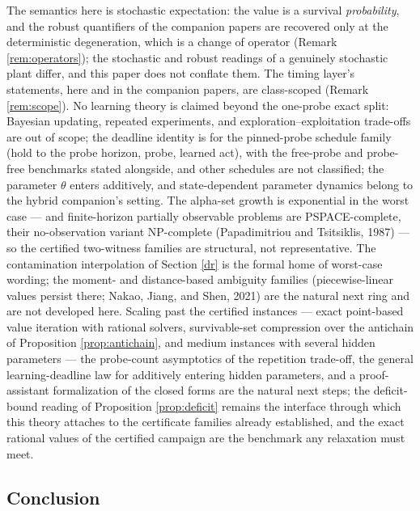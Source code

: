 \documentclass[10pt,twocolumn]{article}
\theoremstyle{plain}
\theoremstyle{definition}
\theoremstyle{remark}
\begin{document}
The semantics here is stochastic expectation: the value is a survival
\emph{probability}, and the robust quantifiers of the companion papers
are recovered only at the deterministic degeneration, which is a change
of operator (Remark \ref{rem:operators}); the stochastic and robust
readings of a genuinely stochastic plant differ, and this paper does not
conflate them. The timing layer's statements, here and in the companion
papers, are class-scoped (Remark \ref{rem:scope}). No learning theory is
claimed beyond the one-probe exact split: Bayesian updating, repeated
experiments, and exploration--exploitation trade-offs are out of scope;
the deadline identity is for the pinned-probe schedule family (hold to
the probe horizon, probe, learned act), with the free-probe and
probe-free benchmarks stated alongside, and other schedules are not
classified; the parameter
\(\theta\) enters additively, and state-dependent parameter dynamics
belong to the hybrid companion's setting. The alpha-set growth is
exponential in the worst case --- and finite-horizon partially
observable problems are PSPACE-complete, their no-observation variant
NP-complete (Papadimitriou and Tsitsiklis, 1987) --- so the certified
two-witness families are structural, not representative. The contamination interpolation of Section \ref{dr} is the formal home
of worst-case wording; the moment- and distance-based ambiguity families
(piecewise-linear values persist there; Nakao, Jiang, and Shen, 2021)
are the natural next ring and are not developed here.
Scaling past the certified instances --- exact point-based value iteration
with rational solvers, survivable-set compression over the antichain of
Proposition \ref{prop:antichain}, and medium instances with several
hidden parameters --- the probe-count asymptotics of the repetition
trade-off, the general learning-deadline law for additively entering
hidden parameters, and a proof-assistant formalization of the closed
forms are the natural next steps; the deficit-bound reading of
Proposition \ref{prop:deficit} remains the interface through which this
theory attaches to the certificate families already established, and the
exact rational values of the certified campaign are the benchmark any
relaxation must meet.

\subsection{Conclusion}\label{conclusion}
\end{document}
